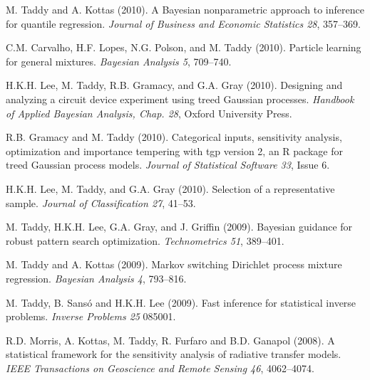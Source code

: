 \documentclass[margin,line]{res}
\begin{document}
\begin{resume}
M.  Taddy and A. Kottas (2010). A Bayesian nonparametric approach to inference for quantile regression.
{\it Journal of Business and Economic Statistics 28}, 357--369.

C.M. Carvalho, H.F. Lopes, N.G. Polson, and M. Taddy
(2010). Particle learning for general mixtures.  {\it Bayesian
  Analysis 5}, 709--740.

H.K.H. Lee, M. Taddy, R.B. Gramacy, and G.A. Gray
(2010). Designing and analyzing a circuit device experiment using
treed Gaussian processes.  {\it Handbook of Applied
  Bayesian Analysis, Chap. 28}, Oxford University Press.

R.B. Gramacy and M. Taddy (2010). Categorical inputs, sensitivity
       analysis, optimization and importance tempering with tgp version 2, an
       R package for treed Gaussian process models. {\it Journal of Statistical Software 33}, Issue 6.


H.K.H. Lee, M. Taddy, and G.A. Gray (2010). Selection of a representative sample.
{\it Journal of Classification 27}, 41--53.

M.  Taddy, H.K.H. Lee, G.A. Gray, and J. Griffin (2009).  Bayesian guidance for robust pattern search optimization.
{\it Technometrics 51}, 389--401.

M. Taddy and A. Kottas (2009).  Markov switching Dirichlet process mixture regression.
{\it Bayesian Analysis 4}, 793--816.

M.  Taddy, B. Sans\'o and H.K.H. Lee (2009). Fast inference for statistical inverse problems.  {\it Inverse Problems 25} 085001.

R.D. Morris, A. Kottas, M. Taddy, R. Furfaro and B.D. Ganapol (2008).
A statistical framework for the sensitivity analysis of radiative transfer models.
{\it IEEE Transactions on Geoscience and Remote Sensing 46}, 4062--4074.






\end{resume}
\end{document}
